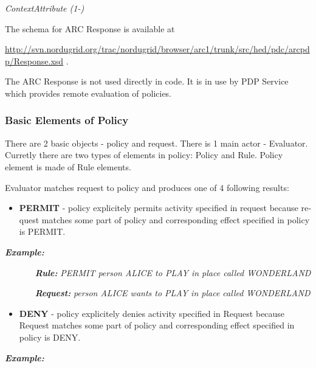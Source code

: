 \documentclass{article}
\newcommand\liststyleWWviiiNumxxi{%
\renewcommand\labelitemi{[F0B7?]}
\renewcommand\labelitemii{o}
\renewcommand\labelitemiii{[F0A7?]}
\renewcommand\labelitemiv{[F0B7?]}
}
\begin{document}
{\itshape\color{black}
   ContextAttribute (1-)}

{\upshape\color{black}
The schema for ARC Response is available at}

{\upshape\color{black}
\url{http://svn.nordugrid.org/trac/nordugrid/browser/arc1/trunk/src/hed/pdc/arcpdp/Response.xsd}
.}

{\upshape\color{black}
The ARC Response is not used directly in code. It is in use by PDP
Service which provides remote evaluation of policies. }

\subsubsection{Basic Elements of Policy}
{\color{black}
There are 2 basic objects - {\textquotedbl}policy{\textquotedbl} and
{\textquotedbl}request{\textquotedbl}. There is 1 main actor -
Evaluator. Curretly there are two types of elements in policy: Policy
and Rule. Policy element is made of Rule elements.}

{\color{black}
Evaluator matches request to policy and produces one of 4 following
results:}

\liststyleWWviiiNumxxi
\begin{itemize}
\item {\color{black}
\foreignlanguage{english}{\textbf{PERMIT}}\foreignlanguage{english}{ -
policy explicitely permits activity specified in request because
request matches some part of policy and corresponding effect specified
in policy is PERMIT. }}
\end{itemize}
{\bfseries\itshape\color{black}
Example: }

{\upshape\color{black}
\foreignlanguage{english}{\textbf{\textit{\ \ \ \ \ \ Rule:
}}}\foreignlanguage{english}{\textit{PERMIT person ALICE to PLAY in
place called WONDERLAND}}}

{\upshape\color{black}
\foreignlanguage{english}{\textbf{\textit{\ \ \ \ \ \ Request:
}}}\foreignlanguage{english}{\textit{person ALICE wants to PLAY in
place called WONDERLAND}}}

\liststyleWWviiiNumxxi
\begin{itemize}
\item {\color{black}
\foreignlanguage{english}{\textbf{DENY}}\foreignlanguage{english}{ -
policy explicitely denies activity specified in Request because Request
matches some part of policy and corresponding effect specified in
policy is DENY.}}
\end{itemize}
{\bfseries\itshape\color{black}
Example:}
\end{document}
